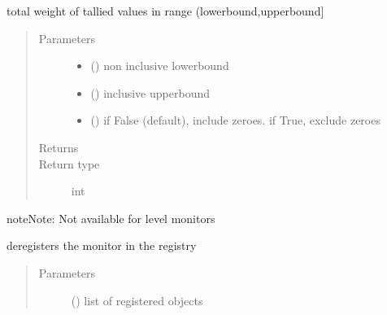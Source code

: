 \documentclass[letterpaper,10pt,english]{sphinxmanual}
\begin{document}
\begin{fulllineitems}
\begin{fulllineitems}
\end{fulllineitems}


\begin{fulllineitems}
\label{\detokenize{Reference:salabim.Monitor.bin_weight}}
total weight of tallied values in range (lowerbound,upperbound{]}
\begin{quote}\begin{description}
\item[{Parameters}] \leavevmode\begin{itemize}
\item {} 
 () \textendash{} non inclusive lowerbound

\item {} 
 () \textendash{} inclusive upperbound

\item {} 
 () \textendash{} if False (default), include zeroes. if True, exclude zeroes

\end{itemize}

\item[{Returns}] \leavevmode
{}

\item[{Return type}] \leavevmode
int

\end{description}\end{quote}

\begin{sphinxadmonition}{note}{Note:}
Not available for level monitors
\end{sphinxadmonition}

\end{fulllineitems}


\begin{fulllineitems}
\label{\detokenize{Reference:salabim.Monitor.deregister}}
deregisters the monitor in the registry
\begin{quote}\begin{description}
\item[{Parameters}] \leavevmode
{} () \textendash{} list of registered objects


\end{description}
\end{quote}
\end{fulllineitems}
\end{fulllineitems}
\end{document}
